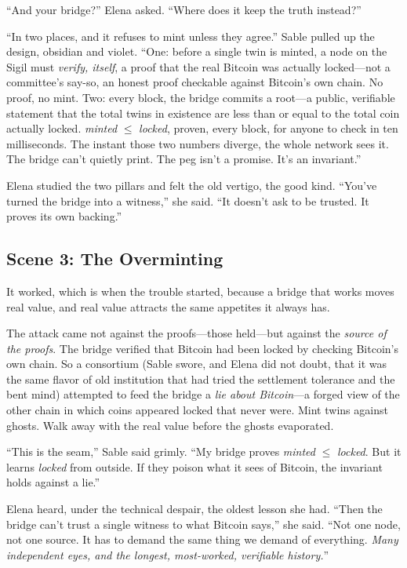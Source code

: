 \documentclass[12pt,letterpaper]{book}
\begin{document}
``And your bridge?'' Elena asked. ``Where does it keep the truth instead?''

``In two places, and it refuses to mint unless they agree.'' Sable pulled up the
design, obsidian and violet. ``One: before a single twin is minted, a node on the
Sigil must \emph{verify, itself}, a proof that the real Bitcoin was actually
locked---not a committee's say-so, an honest proof checkable against Bitcoin's own
chain. No proof, no mint. Two: every block, the bridge commits a root---a public,
verifiable statement that the total twins in existence are less than or equal to
the total coin actually locked. \emph{minted} $\leq$ \emph{locked}, proven, every
block, for anyone to check in ten milliseconds. The instant those two numbers
diverge, the whole network sees it. The bridge can't quietly print. The peg isn't
a promise. It's an invariant.''

Elena studied the two pillars and felt the old vertigo, the good kind. ``You've
turned the bridge into a witness,'' she said. ``It doesn't ask to be trusted. It
proves its own backing.''

\hypertarget{scene-3-the-overminting}{%
\subsection{Scene 3: The
Overminting}\label{scene-3-the-overminting}}

It worked, which is when the trouble started, because a bridge that works moves
real value, and real value attracts the same appetites it always has.

The attack came not against the proofs---those held---but against the \emph{source
of the proofs}. The bridge verified that Bitcoin had been locked by checking
Bitcoin's own chain. So a consortium (Sable swore, and Elena did not doubt, that it
was the same flavor of old institution that had tried the settlement tolerance and
the bent mind) attempted to feed the bridge a \emph{lie about Bitcoin}---a forged
view of the other chain in which coins appeared locked that never were. Mint twins
against ghosts. Walk away with the real value before the ghosts evaporated.

``This is the seam,'' Sable said grimly. ``My bridge proves \emph{minted} $\leq$
\emph{locked}. But it learns \emph{locked} from outside. If they poison what it
sees of Bitcoin, the invariant holds against a lie.''

Elena heard, under the technical despair, the oldest lesson she had. ``Then the
bridge can't trust a single witness to what Bitcoin says,'' she said. ``Not one
node, not one source. It has to demand the same thing we demand of everything.
\emph{Many independent eyes, and the longest, most-worked, verifiable history.}''
\end{document}
